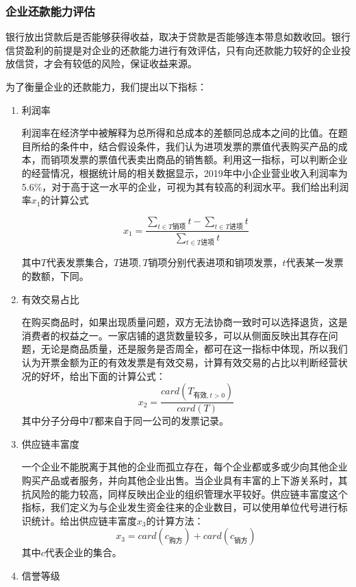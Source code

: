 \documentclass{my_paper}
\begin{document}
\subsubsection{企业还款能力评估}
银行放出贷款后是否能够获得收益，取决于贷款是否能够连本带息如数收回。银行信贷盈利的前提是对企业的还款能力进行有效评估，只有向还款能力较好的企业投放信贷，才会有较低的风险，保证收益来源。

为了衡量企业的还款能力，我们提出以下指标：

\begin{enumerate}
    \item 利润率
    
    利润率\cite{1}在经济学中被解释为总所得和总成本的差额同总成本之间的比值。在题目所给的条件中，结合假设条件，我们认为进项发票的票值代表购买产品的成本，而销项发票的票值代表卖出商品的销售额。利用这一指标，可以判断企业的经营情况，根据统计局的相关数据\cite{2}显示，2019年中小企业营业收入利润率为5.6\%，对于高于这一水平的企业，可视为其有较高的利润水平。我们给出利润率$x_1$的计算公式

    \begin{equation}
    x_1 = \frac{\sum\limits_{t\in T\text{销项}}t-\sum\limits_{t\in T\text{进项}}t}{\sum\limits_{t\in T\text{进项}}t}
    \label{x1}
    \end{equation}

    其中$T$代表发票集合，$T\text{进项},T\text{销项}$分别代表进项和销项发票，$t$代表某一发票的数额，下同。
    \item 有效交易占比
    
    在购买商品时，如果出现质量问题，双方无法协商一致时可以选择退货，这是消费者的权益之一。一家店铺的退货数量较多，可以从侧面反映出其存在问题，无论是商品质量，还是服务是否周全，都可在这一指标中体现，所以我们认为开票金额为正的有效发票是有效交易，计算有效交易的占比以判断经营状况的好坏，给出下面的计算公式：
    \begin{equation}
        x_2 = \frac{card(T_{\text{有效},t>0})}{card(T)}
        \label{x2}
    \end{equation}
    其中分子分母中$T$都来自于同一公司的发票记录。

    \item 供应链丰富度
    
    一个企业不能脱离于其他的企业而孤立存在，每个企业都或多或少向其他企业购买产品或者服务，并向其他企业出售。当企业具有丰富的上下游关系时，其抗风险的能力较高，同样反映出企业的组织管理水平较好。供应链丰富度这个指标，我们定义为与企业发生资金往来的企业数目，可以使用单位代号进行标识统计。给出供应链丰富度$x_3$的计算方法：
    \begin{equation}
    x_3 = card(c_{\text{购方}})+card(c_{\text{销方}})
    \label{x3}
    \end{equation}
    其中$c$代表企业的集合。
    \item 信誉等级
    

\end{enumerate}
\end{document}
